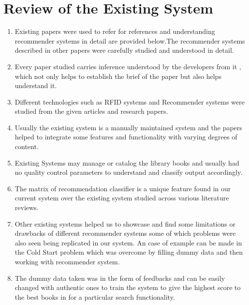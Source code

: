 \documentclass[a4paper,12pt]{report}
\begin{document}
\section{Review of the Existing System}
\begin{enumerate}
   \item Existing papers were used to refer for references and understanding recommender systems in detail are provided below.The recommender systems described in other papers were carefully studied and understood in detail.
       
   \item Every paper studied carries inference understood by the developers from it , which not only helps to establish the brief of the paper but also helps understand it.
       
   \item Different technologies such as RFID systems and Recommender systems were studied from the given articles and research papers.
       
   \item Usually the existing system is a manually maintained system and the papers helped to integrate some features and functionality with varying degrees of content.
       
   \item Existing Systems may manage or catalog the library books and usually had no quality control parameters to understand and classify output accordingly.
       
   \item The matrix of recommendation classifier is a unique feature found in our current system over the existing system studied across various literature reviews.
   
   \item Other existing systems helped us to showcase and find some limitations or drawbacks of different recommender systems some of which problems were also seen being replicated in our system. An case of example can be made in the Cold Start problem which was overcome by filling dummy data and then working with recommender system.
       
   \item The dummy data taken was in the form of feedbacks and can be easily changed with authentic ones to train the system to give the highest score to the best books in for a particular search functionality.
\end{enumerate}   
\end{document}
